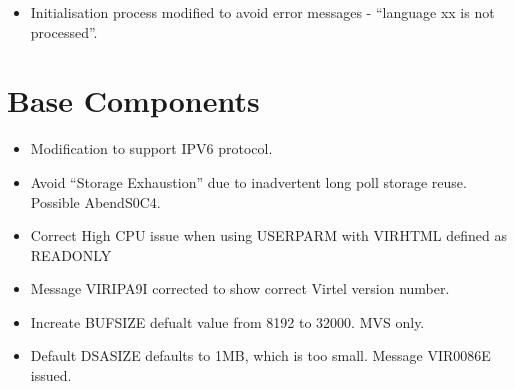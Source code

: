 \documentclass[letterpaper,10pt,english]{sphinxmanual}
\begin{document}
\begin{itemize}
\item {} 
Initialisation process modified to avoid error messages - “language xx is not processed”.

\end{itemize}

\newpage


\section{Base Components}
\label{\detokenize{TN202101:base-components}}
\begin{itemize}
\item {} 
Modification to support IPV6 protocol.

\end{itemize}

\begin{itemize}
\item {} 
Avoid “Storage Exhaustion” due to inadvertent long poll storage reuse. Possible AbendS0C4.

\end{itemize}

\begin{itemize}
\item {} 
Correct High CPU issue when using USERPARM with VIRHTML defined as READONLY

\end{itemize}

\begin{itemize}
\item {} 
Message VIRIPA9I corrected to show correct Virtel version number.

\end{itemize}

\begin{itemize}
\item {} 
Increate BUFSIZE defualt value from 8192 to 32000. MVS only.

\end{itemize}

\begin{itemize}
\item {} 
Default DSASIZE defaults to 1MB, which is too small. Message VIR0086E issued.

\end{itemize}
\end{document}
